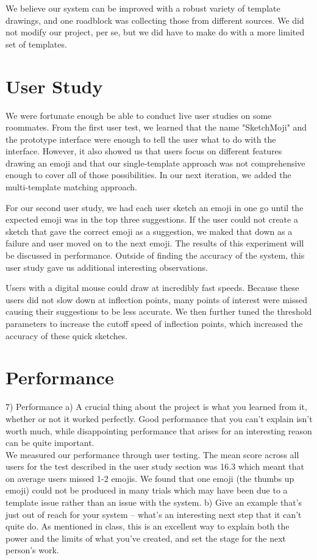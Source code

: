 \documentclass{article}
\begin{document}
We believe our system can be improved with a robust variety of template drawings, and one roadblock was collecting those from different sources. We did not modify our project, per se, but we did have to make do with a more limited set of templates.

\section{User Study}

We were fortunate enough be able to conduct live user studies on some roommates. From the first user test, we learned that the name "SketchMoji" and the prototype interface were enough to tell the user what to do with the interface. However, it also showed us that users focus on different features drawing an emoji and that our single-template approach was not comprehensive enough to cover all of those possibilities. In our next iteration, we added the multi-template matching approach.

For our second user study, we had each user sketch an emoji in one go until the expected emoji was in the top three suggestions. If the user could not create a sketch that gave the correct emoji as a suggestion, we maked that down as a failure and user moved on to the next emoji. The results of this experiment will be discussed in performance. Outside of finding the accuracy of the system, this user study gave us additional interesting observations.

Users with a digital mouse could draw at incredibly fast speeds. Because these users did not slow down at inflection points, many points of interest were missed causing their suggestions to be less accurate. We then further tuned the threshold parameters to increase the cutoff speed of inflection points, which increased the accuracy of these quick sketches.

\section{Performance}
7) Performance
a) A crucial thing about the project is what you learned from it, whether or not it worked
perfectly. Good performance that you can’t explain isn’t worth much, while
disappointing performance that arises for an interesting reason can be quite important.
\\
We measured our performance through user testing. The mean score across all users for the test described in the user study section was 16.3 which meant that on average users missed 1-2 emojis. We found that one emoji (the thumbs up emoji) could not be produced in many trials which may have been due to a template issue rather than an issue with the system.
b) Give an example that’s just out of reach for your system – what’s an interesting next step
that it can’t quite do. As mentioned in class, this is an excellent way to explain both the
power and the limits of what you’ve created, and set the stage for the next person’s work.
\end{document}
